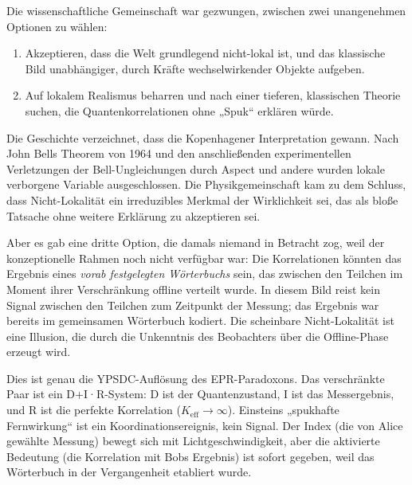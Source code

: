 \documentclass[12pt,a4paper]{article}
\begin{document}
	Die wissenschaftliche Gemeinschaft war gezwungen, zwischen zwei unangenehmen Optionen zu wählen:
	\begin{enumerate}
		\item Akzeptieren, dass die Welt grundlegend nicht-lokal ist, und das klassische Bild unabhängiger, durch Kräfte wechselwirkender Objekte aufgeben.
		\item Auf lokalem Realismus beharren und nach einer tieferen, klassischen Theorie suchen, die Quantenkorrelationen ohne „Spuk“ erklären würde.
	\end{enumerate}
	
	Die Geschichte verzeichnet, dass die Kopenhagener Interpretation gewann. Nach John Bells Theorem von 1964 und den anschließenden experimentellen Verletzungen der Bell-Ungleichungen durch Aspect und andere wurden lokale verborgene Variable ausgeschlossen. Die Physikgemeinschaft kam zu dem Schluss, dass Nicht-Lokalität ein irreduzibles Merkmal der Wirklichkeit sei, das als bloße Tatsache ohne weitere Erklärung zu akzeptieren sei.
	
	Aber es gab eine dritte Option, die damals niemand in Betracht zog, weil der konzeptionelle Rahmen noch nicht verfügbar war: Die Korrelationen könnten das Ergebnis eines \emph{vorab festgelegten Wörterbuchs} sein, das zwischen den Teilchen im Moment ihrer Verschränkung offline verteilt wurde. In diesem Bild reist kein Signal zwischen den Teilchen zum Zeitpunkt der Messung; das Ergebnis war bereits im gemeinsamen Wörterbuch kodiert. Die scheinbare Nicht-Lokalität ist eine Illusion, die durch die Unkenntnis des Beobachters über die Offline-Phase erzeugt wird.
	
	Dies ist genau die YPSDC-Auflösung des EPR-Paradoxons. Das verschränkte Paar ist ein D+I·R-System: D ist der Quantenzustand, I ist das Messergebnis, und R ist die perfekte Korrelation (\(K_{\mathrm{eff}} \to \infty\)). Einsteins „spukhafte Fernwirkung“ ist ein Koordinationsereignis, kein Signal. Der Index (die von Alice gewählte Messung) bewegt sich mit Lichtgeschwindigkeit, aber die aktivierte Bedeutung (die Korrelation mit Bobs Ergebnis) ist sofort gegeben, weil das Wörterbuch in der Vergangenheit etabliert wurde.
	
\end{document}
